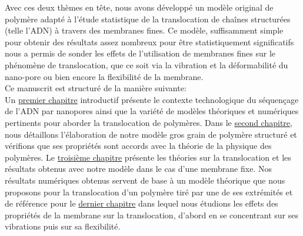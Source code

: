 Avec ces deux thèmes en t\^{e}te, nous avons développé un modèle original de polymère adapté à l'étude statistique de la translocation de cha\^{i}nes structurées (telle l'ADN) à travers des membranes fines. Ce modèle, suffisamment simple pour obtenir des résultats assez nombreux pour \^{e}tre statistiquement significatifs nous a permis de sonder les effets de l'utilisation de membranes fines sur le phénomène de translocation, que ce soit via la vibration et la déformabilité du nano-pore ou bien encore la flexibilité de la membrane.\\

Ce manuscrit est structuré de la manière suivante:\\

Un \hyperref[intro]{premier chapitre} introductif présente le contexte technologique du séquençage de l'ADN par nanopores ainsi que la variété de modèles théoriques et numériques pertinents pour aborder la translocation de polymères. Dans le \hyperref[polymerevalidation]{second chapitre}, nous détaillons l'élaboration de notre modèle gros grain de polymère structuré et vérifions que ses propriétés sont accords avec la théorie de la physique des polymères. Le \hyperref[translocmurfixe]{troisième chapitre} présente les théories sur la translocation et les résultats obtenus avec notre modèle dans le cas d'une membrane fixe. Nos résultats numériques obtenus servent de base à un modèle théorique que nous proposons pour la translocation d'un polymère tiré par une de ses extrémités et de référence pour le \hyperref[effetsmembrane]{dernier chapitre} dans lequel nous étudions les effets des propriétés de la membrane sur la translocation, d'abord en se concentrant sur ses vibrations puis sur sa flexibilité.



